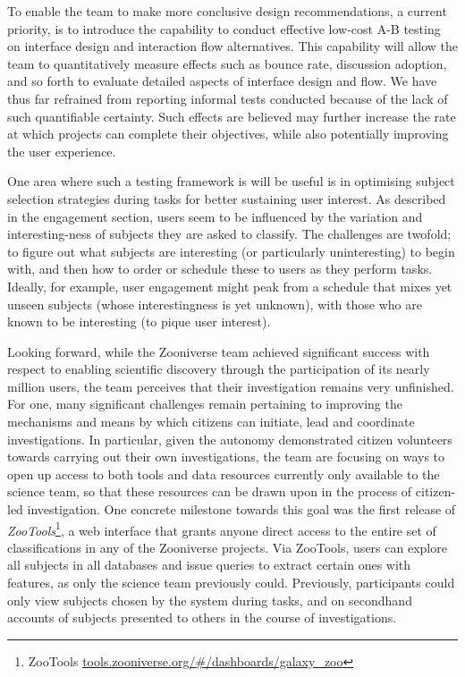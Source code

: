 \documentclass{sigchi}
\begin{document}
To enable the team to make more conclusive design recommendations, a current priority, is to introduce the capability to conduct effective low-cost A-B testing on interface design and interaction flow alternatives.  This capability will allow the team to quantitatively measure effects such as bounce rate, discussion adoption, and so forth to evaluate detailed aspects of interface design and flow. We have thus far refrained from reporting informal tests conducted because of the lack of such quantifiable certainty.  Such effects are believed may further increase the rate at which projects can complete their objectives, while also potentially improving the user experience.

One area where such a testing framework is will be useful is in optimising subject selection strategies during tasks for better sustaining user interest.  As described in the engagement section, users seem to be influenced by the variation and interesting-ness of subjects they are asked to classify.  The challenges are twofold; to figure out what subjects are interesting (or particularly uninteresting) to begin with, and then how to order or schedule these to users as they perform tasks.  Ideally, for example, user engagement might peak from a schedule that mixes yet unseen subjects (whose interestingness is yet unknown), with those who are known to be interesting (to pique user interest).

Looking forward, while the Zooniverse team achieved significant success with respect to enabling scientific discovery through the participation of its nearly million users, the team perceives that their investigation remains very unfinished.  For one, many significant challenges remain pertaining to improving the mechanisms and means by which citizens can initiate, lead and coordinate investigations.  In particular, given the autonomy demonstrated citizen volunteers towards carrying out their own investigations, the team are focusing on ways to open up access to both tools and data resources currently only available to the science team, so that these resources can be drawn upon in the process of citizen-led investigation.  One concrete milestone towards this goal was the first release of \emph{ZooTools}\footnote{ZooTools \url{tools.zooniverse.org/\#/dashboards/galaxy_zoo}}, a web interface that grants anyone direct access to the entire set of classifications in any of the Zooniverse projects.  Via ZooTools, users can explore all subjects in all databases and issue queries to extract certain ones with features, as only the science team previously could.  Previously, participants could only view subjects chosen by the system during tasks, and on secondhand accounts of subjects presented to others in the course of investigations.
\end{document}
